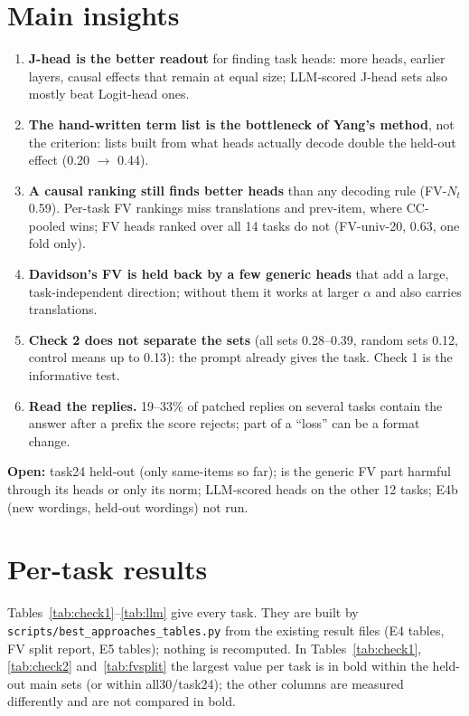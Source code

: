 \documentclass[10pt,a4paper]{article}
\begin{document}
\section{Main insights}
\begin{enumerate}
\item \textbf{J-head is the better readout} for finding task heads: more heads, earlier layers, causal effects that remain at equal size; LLM-scored J-head sets also mostly beat Logit-head ones.
\item \textbf{The hand-written term list is the bottleneck of Yang's method}, not the criterion: lists built from what heads actually decode double the held-out effect (0.20 $\to$ 0.44).
\item \textbf{A causal ranking still finds better heads} than any decoding rule (FV-$N_t$ 0.59). Per-task FV rankings miss translations and prev-item, where CC-pooled wins; FV heads ranked over all 14 tasks do not (FV-univ-20, 0.63, one fold only).
\item \textbf{Davidson's FV is held back by a few generic heads} that add a large, task-independent direction; without them it works at larger $\alpha$ and also carries translations.
\item \textbf{Check 2 does not separate the sets} (all sets 0.28--0.39, random sets 0.12, control means up to 0.13): the prompt already gives the task. Check 1 is the informative test.
\item \textbf{Read the replies.} 19--33\% of patched replies on several tasks contain the answer after a prefix the score rejects; part of a ``loss'' can be a format change.
\end{enumerate}

\textbf{Open:} task24 held-out (only same-items so far); is the generic FV part harmful through its heads or only its norm; LLM-scored heads on the other 12 tasks; E4b (new wordings, held-out wordings) not run.

\clearpage
\appendix
\section{Per-task results}\label{sec:tables}

Tables~\ref{tab:check1}--\ref{tab:llm} give every task. They are built by \texttt{scripts/best\_approaches\_tables.py} from the existing result files (E4 tables, FV split report, E5 tables); nothing is recomputed. In Tables~\ref{tab:check1}, \ref{tab:check2} and~\ref{tab:fvsplit} the largest value per task is in bold within the held-out main sets (or within all30/task24); the other columns are measured differently and are not compared in bold.
\end{document}
